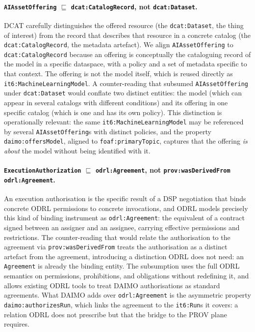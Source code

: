 \documentclass[Afour,sagev,times]{sagej}
\newcommand{\code}[1]{\texttt{#1}}
\begin{document}
\paragraph{\code{AIAssetOffering} $\sqsubseteq$ \code{dcat:CatalogRecord}, not \code{dcat:Dataset}.} DCAT carefully distinguishes the offered resource (the \code{dcat:Dataset}, the thing of interest) from the record that describes that resource in a concrete catalog (the \code{dcat:CatalogRecord}, the metadata artefact). We align \code{AIAssetOffering} to \code{dcat:CatalogRecord} because an offering is conceptually the cataloguing record of the model in a specific dataspace, with a policy and a set of metadata specific to that context. The offering is not the model itself, which is reused directly as \code{it6:MachineLearningModel}. A counter-reading that subsumed \code{AIAssetOffering} under \code{dcat:Dataset} would conflate two distinct entities: the model (which can appear in several catalogs with different conditions) and its offering in one specific catalog (which is one and has its own policy). This distinction is operationally relevant: the same \code{it6:MachineLearningModel} may be referenced by several \code{AIAssetOffering}s with distinct policies, and the property \code{daimo:offersModel}, aligned to \code{foaf:primaryTopic}, captures that the offering \emph{is about} the model without being identified with it.

\paragraph{\code{ExecutionAuthorization} $\sqsubseteq$ \code{odrl:Agreement}, not \code{prov:wasDerivedFrom odrl:Agreement}.} An execution authorisation is the specific result of a DSP negotiation that binds concrete ODRL permissions to concrete invocations, and ODRL models precisely this kind of binding instrument as \code{odrl:Agreement}: the equivalent of a contract signed between an assigner and an assignee, carrying effective permissions and restrictions. The counter-reading that would relate the authorisation to the agreement via \code{prov:wasDerivedFrom} treats the authorisation as a distinct artefact from the agreement, introducing a distinction ODRL does not need: an \code{Agreement} is already the binding entity. The subsumption uses the full ODRL semantics on permissions, prohibitions, and obligations without redefining it, and allows existing ODRL tools to treat DAIMO authorisations as standard agreements. What DAIMO adds over \code{odrl:Agreement} is the asymmetric property \code{daimo:authorizesRun}, which links the agreement to the \code{it6:Run}s it covers: a relation ODRL does not prescribe but that the bridge to the PROV plane requires.
\end{document}
